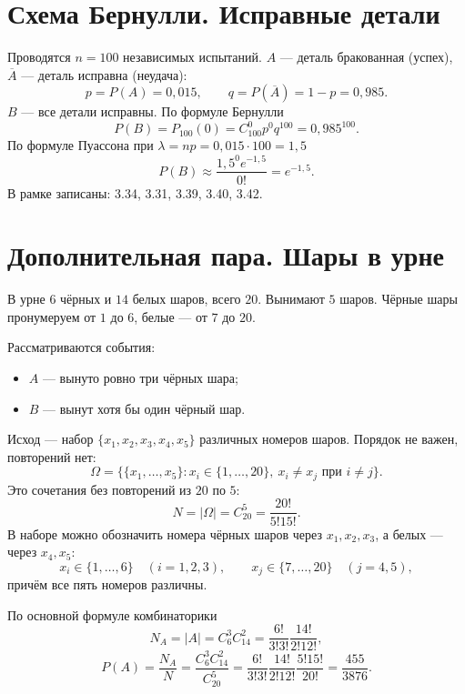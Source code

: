 


\section*{Схема Бернулли. Исправные детали}
Проводятся $n=100$ независимых испытаний.
$A$ --- деталь бракованная (успех), $\overline A$ --- деталь исправна (неудача):
\[
 p=P(A)=0{,}015,\qquad q=P(\overline A)=1-p=0{,}985.
\]
$B$ --- все детали исправны. По формуле Бернулли
\[
 P(B)=P_{100}(0)=C_{100}^0p^0q^{100}=0{,}985^{100}.
\]
По формуле Пуассона при $\lambda=np=0{,}015\cdot100=1{,}5$
\[
 P(B)\approx\frac{1{,}5^0e^{-1{,}5}}{0!}=e^{-1{,}5}.
\]
В рамке записаны: 3.34, 3.31, 3.39, 3.40, 3.42.

\section*{Дополнительная пара. Шары в урне}
В урне $6$ чёрных и $14$ белых шаров, всего $20$. Вынимают $5$ шаров.
Чёрные шары пронумеруем от $1$ до $6$, белые --- от $7$ до $20$.

Рассматриваются события:
\begin{itemize}
 \item $A$ --- вынуто ровно три чёрных шара;
 \item $B$ --- вынут хотя бы один чёрный шар.
\end{itemize}
Исход --- набор $\{x_1,x_2,x_3,x_4,x_5\}$ различных номеров шаров.
Порядок не важен, повторений нет:
\[
 \Omega=\bigl\{\{x_1,\ldots,x_5\}:x_i\in\{1,\ldots,20\},\
 x_i\ne x_j\text{ при }i\ne j\bigr\}.
\]
Это сочетания без повторений из $20$ по $5$:
\[
 N=|\Omega|=C_{20}^5=\frac{20!}{5!15!}.
\]
В наборе можно обозначить номера чёрных шаров через $x_1,x_2,x_3$,
а белых --- через $x_4,x_5$:
\[
 x_i\in\{1,\ldots,6\}\quad(i=1,2,3),\qquad
 x_j\in\{7,\ldots,20\}\quad(j=4,5),
\]
причём все пять номеров различны.

По основной формуле комбинаторики
\[
 N_A=|A|=C_6^3C_{14}^2=\frac{6!}{3!3!}\frac{14!}{2!12!},
\]
\[
 P(A)=\frac{N_A}{N}=\frac{C_6^3C_{14}^2}{C_{20}^5}
 =\frac{6!}{3!3!}\frac{14!}{2!12!}\frac{5!15!}{20!}
 =\frac{455}{3876}.
\]

